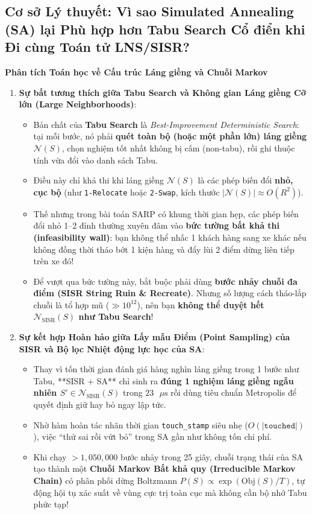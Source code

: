 \documentclass[11pt,a4paper]{article}
\theoremstyle{definition}
\newenvironment{optbox}[1]{%
    \par\medskip\noindent
    \begin{lrbox}{\calloutbox}%
    \begin{minipage}{\dimexpr\linewidth-2\fboxsep-2\fboxrule\relax}
    \textbf{\textcolor{accentgreen}{#1}}\par\smallskip
}{%
    \end{minipage}%
    \end{lrbox}%
    \fcolorbox{accentgreen}{softgreen}{\usebox{\calloutbox}}%
    \par\medskip
}
\begin{document}
\subsection{Cơ sở Lý thuyết: Vì sao Simulated Annealing (SA) lại Phù hợp hơn Tabu Search Cổ điển khi Đi cùng Toán tử LNS/SISR?}

\begin{optbox}{Phân tích Toán học về Cấu trúc Láng giềng và Chuỗi Markov}
\begin{enumerate}[leftmargin=1.5em]
    \item \textbf{Sự bất tương thích giữa Tabu Search và Không gian Láng giềng Cỡ lớn (Large Neighborhoods)}:
    \begin{itemize}[leftmargin=1.2em]
        \item Bản chất của \textbf{Tabu Search} là \textit{Best-Improvement Deterministic Search}: tại mỗi bước, nó phải \textbf{quét toàn bộ (hoặc một phần lớn) láng giềng $\mathcal{N}(S)$}, chọn nghiệm tốt nhất không bị cấm (non-tabu), rồi ghi thuộc tính vừa đổi vào danh sách Tabu.
        \item Điều này chỉ khả thi khi láng giềng $\mathcal{N}(S)$ là các phép biến đổi \textbf{nhỏ, cục bộ} (như \texttt{1-Relocate} hoặc \texttt{2-Swap}, kích thước $|\mathcal{N}(S)| \approx O(R^2)$).
        \item Thế nhưng trong bài toán SARP có khung thời gian hẹp, các phép biến đổi nhỏ 1--2 đỉnh thường xuyên đâm vào \textbf{bức tường bất khả thi (infeasibility wall)}: bạn không thể nhấc 1 khách hàng sang xe khác nếu không đồng thời tháo bớt 1 kiện hàng và đẩy lùi 2 điểm dừng liên tiếp trên xe đó!
        \item Để vượt qua bức tường này, bắt buộc phải dùng \textbf{bước nhảy chuỗi đa điểm (SISR String Ruin \& Recreate)}. Nhưng số lượng cách tháo-lắp chuỗi là tổ hợp mũ ($\gg 10^{12}$), nên bạn \textbf{không thể duyệt hết $\mathcal{N}_{\text{SISR}}(S)$ như Tabu Search}!
    \end{itemize}
    \item \textbf{Sự kết hợp Hoàn hảo giữa Lấy mẫu Điểm (Point Sampling) của SISR và Bộ lọc Nhiệt động lực học của SA}:
    \begin{itemize}[leftmargin=1.2em]
        \item Thay vì tốn thời gian đánh giá hàng nghìn láng giềng trong 1 bước như Tabu, **SISR + SA** chỉ sinh ra \textbf{đúng 1 nghiệm láng giềng ngẫu nhiên $S' \in \mathcal{N}_{\text{SISR}}(S)$} trong $23\text{ }\mu\text{s}$ rồi dùng tiêu chuẩn Metropolis để quyết định giữ hay bỏ ngay lập tức.
        \item Nhờ hàm hoàn tác nhãn thời gian \texttt{touch\_stamp} siêu nhẹ ($O(|\texttt{touched}|)$), việc ``thử sai rồi vứt bỏ'' trong SA gần như không tốn chi phí.
        \item Khi chạy $>1,050,000$ bước nhảy trong 25 giây, chuỗi trạng thái của SA tạo thành một \textbf{Chuỗi Markov Bất khả quy (Irreducible Markov Chain)} có phân phối dừng Boltzmann $P(S) \propto \exp(\text{Obj}(S)/T)$, tự động hội tụ xác suất về vùng cực trị toàn cục mà không cần bộ nhớ Tabu phức tạp!
    \end{itemize}
\end{enumerate}
\end{optbox}
\end{document}
